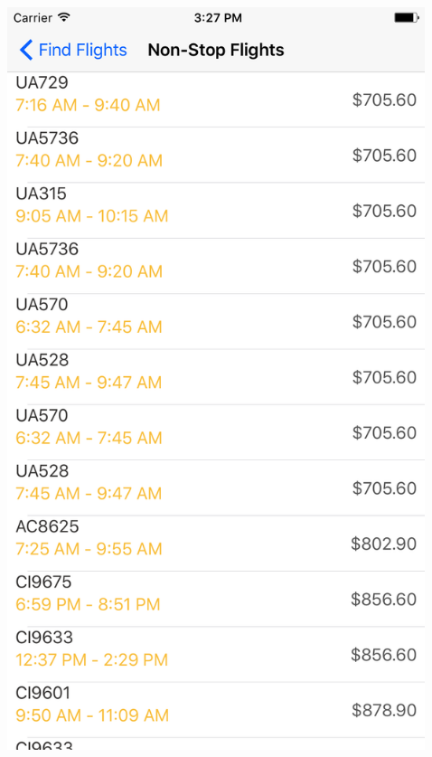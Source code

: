 \documentclass{beamer}
\begin{document}
\begin{frame}
\begin{columns}
\begin{column}{0.3\textwidth}
\begin{center}
        \end{center}
    \end{column}
    \begin{column}{0.3\textwidth}  %
        \begin{center}
            \includegraphics[scale=0.08]{flightsTable}
        \end{center}
    \end{column}
    \begin{column}{0.3\textwidth}  %

\end{column}
\end{columns}
\end{frame}
\end{document}
